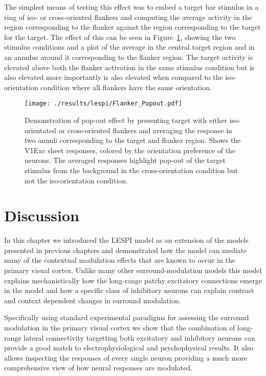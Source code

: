 The simplest means of testing this effect was to embed a target bar
stimulus in a ring of iso- or cross-oriented flankers and computing
the average activity in the region corresponding to the flanker
against the region corresponding to the target for the target. The
effect of this can be seen in Figure~\ref{Flanker_PopOut}, showing the
two stimulus conditions and a plot of the average in the central
target region and in an annulus around it corresponding to the flanker
region. The target activity is elevated above both the flanker
activation in the same stimulus condition but is also elevated more
importantly is also elevated when compared to the iso-orientation
condition where all flankers have the same orientation.

\begin{figure}
	\centering
        \texttt{[image: ./results/lespi/Flanker\_Popout.pdf]}
	\caption[Pop-out effect in simple flanker paradigm.]{Demonstration
      of pop-out effect by presenting target with either
      iso-orientated or cross-oriented flankers and averaging the
      response in two annuli corresponding to the target and flanker
      region. Shows the V1Exc sheet responses, colored by the
      orientation preference of the neurons. The averaged responses
      highlight pop-out of the target stimulus from the background in
      the cross-orientation condition but not the iso-orientation
      condition.}
	\label{Flanker_PopOut}
\end{figure}

\section{Discussion}

In this chapter we introduced the LESPI model as an extension of the
models presented in previous chapters and demonstrated how the model
can mediate many of the contextual modulation effects that are known
to occur in the primary visual cortex. Unlike many other 
surround-modulation models this model explains mechanistically how the
long-range patchy excitatory connections emerge in the model and how a
specific class of inhibitory neurons can explain contrast and context
dependent changes in surround modulation.

Specifically using standard experimental paradigms for assessing the
surround modulation in the primary visual cortex we show that the
combination of long-range lateral connectivity targetting both
excitatory and inhibitory neurons can provide a good match to
electrophysiological and psychophysical results. It also allows
inspecting the responses of every single neuron providing a much more
comprehensive view of how neural responses are modulated.

